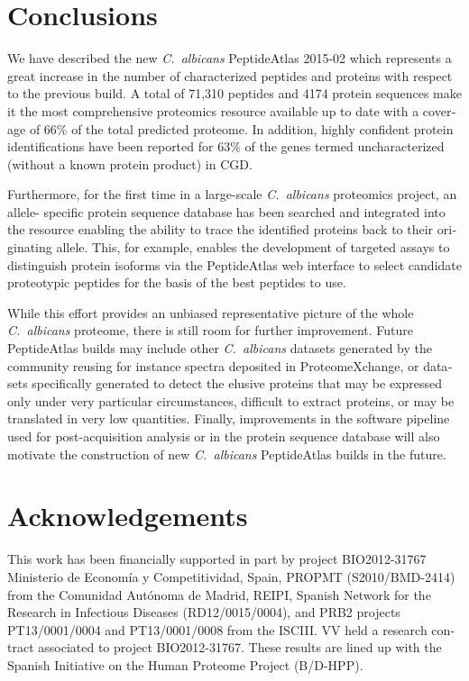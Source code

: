 \begin{otherlanguage}{british}
\section*{Conclusions}

We have described the new \textit{\mbox{C. albicans}} PeptideAtlas 2015-02 which represents a great
increase in the number of characterized peptides and proteins with respect to the previous
build. A total of 71,310 peptides and 4174 protein sequences make it the most
comprehensive proteomics resource available up to date with a coverage of 66\% of the total
predicted proteome. In addition, highly confident protein identifications have been reported
for 63\% of the genes termed uncharacterized (without a known protein product) in CGD.

Furthermore, for the first time in a large-scale \textit{\mbox{C. albicans}} proteomics project, an allele-
specific protein sequence database has been searched and integrated into the resource
enabling the ability to trace the identified proteins back to their originating allele. This, for
example, enables the development of targeted assays to distinguish protein isoforms via the
PeptideAtlas web interface \citep{Farrah2011} to select candidate proteotypic peptides for the basis of the
best peptides to use.

While this effort provides an unbiased representative picture of the whole \textit{\mbox{C. albicans}}
proteome, there is still room for further improvement. Future PeptideAtlas builds may include other \textit{\mbox{C. albicans}}
datasets generated by the community reusing for instance spectra deposited in ProteomeXchange,
or datasets specifically generated to detect the elusive proteins that may be expressed only
under very particular circumstances, difficult to extract proteins, or may be translated in very
low quantities. Finally, improvements in the software pipeline used for post-acquisition
analysis or in the protein sequence database will also motivate the construction of new
\textit{\mbox{C. albicans}} PeptideAtlas builds in the future.


\section*{Acknowledgements}

This work has been financially supported in part by project BIO2012-31767 
Ministerio de Econom\'ia y Competitividad, Spain, PROPMT (S2010/BMD-2414)
from the Comunidad Aut\'onoma de Madrid, REIPI, Spanish Network for the
Research in Infectious Diseases (RD12/0015/0004), and PRB2 projects PT13/0001/0004 
and PT13/0001/0008 from the ISCIII. VV held a research contract associated to project BIO2012-31767.
These results are lined up with the Spanish Initiative on the Human Proteome Project (B/D-HPP).


\end{otherlanguage}
